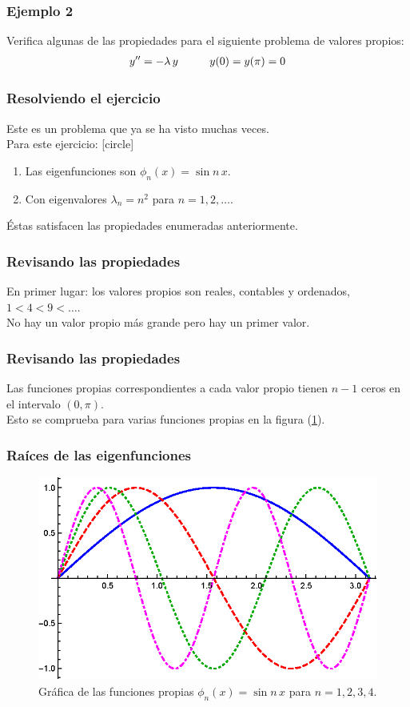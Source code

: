 \documentclass[12pt]{beamer}
\begin{document}
\begin{frame}
\frametitle{Ejemplo 2}
Verifica algunas de las propiedades para el siguiente problema de valores propios:
\pause
\begin{align*}
{y}^{\prime \prime} = - \lambda \, y \hspace{1cm} y(0) = y(\pi) = 0
\end{align*}
\end{frame}
\begin{frame}
\frametitle{Resolviendo el ejercicio}
Este es un problema que ya se ha visto muchas veces.
\\
\bigskip
\pause
Para este ejercicio:
[circle]
\begin{enumerate}[<+->]
\item Las eigenfunciones son $\phi_{n} (x) = \sin n\, x$.
\item Con eigenvalores $\lambda_{n} = n^{2}$ para $n = 1, 2, \ldots$.
\end{enumerate}
\pause
Éstas satisfacen las propiedades enumeradas anteriormente.
\end{frame}
\begin{frame}
\frametitle{Revisando las propiedades}
En primer lugar: \pause los valores propios son reales, contables y ordenados, $1 < 4 < 9 < \ldots$.
\\
\bigskip
\pause
No hay un valor propio más grande pero hay un primer valor.
\end{frame}
\begin{frame}
\frametitle{Revisando las propiedades}
Las funciones propias correspondientes a cada valor propio tienen $n -1$ ceros en el intervalo $(0, \pi)$.
\\
\bigskip
\pause
Esto se comprueba para varias funciones propias en la figura (\ref{fig:figura_04_01}).
\end{frame}
\begin{frame}
\frametitle{Raíces de las eigenfunciones}
\begin{figure}[H]
\centering
\includegraphics[scale=1]{Imagenes/Eigenfunciones_Sin_nx.eps}
\caption{Gráfica de las funciones propias $\phi_{n} (x) = \sin n \,x$ para $n = 1, 2, 3, 4$.}
\label{fig:figura_04_01}
\end{figure}
\end{frame}
\end{document}
